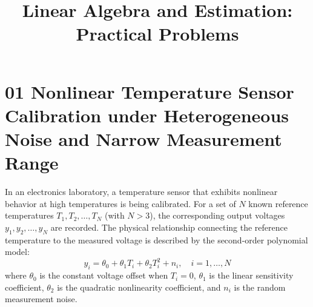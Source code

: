 \documentclass[12pt, letterpaper]{article}
\title{Linear Algebra and Estimation: Practical Problems}
\author{}
\date{}
\begin{document}
\maketitle

\section*{01 Nonlinear Temperature Sensor Calibration under Heterogeneous Noise and Narrow Measurement Range}

In an electronics laboratory, a temperature sensor that exhibits nonlinear behavior at high temperatures is being calibrated. For a set of $N$ known reference temperatures $T_1, T_2, \dots, T_N$ (with $N > 3$), the corresponding output voltages $y_1, y_2, \dots, y_N$ are recorded. The physical relationship connecting the reference temperature to the measured voltage is described by the second-order polynomial model:   
\begin{equation}
    y_i = \theta_0 + \theta_1 T_i + \theta_2 T_i^2 + n_i, \quad i = 1, \dots, N
\end{equation}
where $\theta_0$ is the constant voltage offset when $T_i = 0$, $\theta_1$ is the linear sensitivity coefficient, $\theta_2$ is the quadratic nonlinearity coefficient, and $n_i$ is the random measurement noise.   
\end{document}
